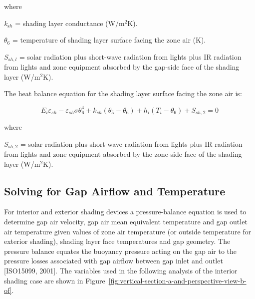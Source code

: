 where

\emph{k\(_{sh}\)} = shading layer conductance (W/m\(^{2}\)K).

\emph{$\theta$\(_{6}\)} = temperature of shading layer surface facing the zone air (K).

\emph{S\(_{sh,l}\)} = solar radiation plus short-wave radiation from lights plus IR radiation from lights and zone equipment absorbed by the gap-side face of the shading layer (W/m\(^{2}\)K).

The heat balance equation for the shading layer surface facing the zone air is:

\begin{equation}
{E_i}{\varepsilon_{sh}} - {\varepsilon_{sh}}\sigma \theta_6^4 + {k_{sh}}\left( {{\theta_5} - {\theta_6}} \right) + {h_i}\left( {{T_i} - {\theta_6}} \right) + {S_{sh,2}} = 0
\end{equation}

where

\emph{S\(_{sh,2}\)} = solar radiation plus short-wave radiation from lights plus IR radiation from lights and zone equipment absorbed by the zone-side face of the shading layer (W/m\(^{2}\)K).

\subsection{Solving for Gap Airflow and Temperature}\label{solving-for-gap-airflow-and-temperature}

For interior and exterior shading devices a pressure-balance equation is used to determine gap air velocity, gap air mean equivalent temperature and gap outlet air temperature given values of zone air temperature (or outside temperature for exterior shading), shading layer face temperatures and gap geometry. The pressure balance equates the buoyancy pressure acting on the gap air to the pressure losses associated with gap airflow between gap inlet and outlet {[}ISO15099, 2001{]}. The variables used in the following analysis of the interior shading case are shown in Figure~\ref{fig:vertical-section-a-and-perspective-view-b-of}.


